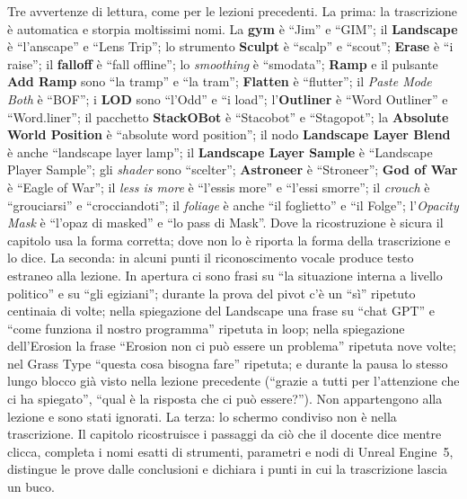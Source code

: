 Tre avvertenze di lettura, come per le lezioni precedenti. La prima: la trascrizione è
automatica e storpia moltissimi nomi. La \textbf{gym} è ``Jim'' e ``GIM''; il
\textbf{Landscape} è ``l'anscape'' e ``Lens Trip''; lo strumento \textbf{Sculpt} è ``scalp''
e ``scout''; \textbf{Erase} è ``i raise''; il \textbf{falloff} è ``fall offline''; lo
\emph{smoothing} è ``smodata''; \textbf{Ramp} e il pulsante \textbf{Add Ramp} sono ``la
tramp'' e ``la tram''; \textbf{Flatten} è ``flutter''; il \emph{Paste Mode Both} è ``BOF'';
i \textbf{LOD} sono ``l'Odd'' e ``i load''; l'\textbf{Outliner} è ``Word Outliner'' e
``Word.liner''; il pacchetto \textbf{StackOBot} è ``Stacobot'' e ``Stagopot''; la
\textbf{Absolute World Position} è ``absolute word position''; il nodo
\textbf{Landscape Layer Blend} è anche ``landscape layer lamp''; il \textbf{Landscape
Layer Sample} è ``Landscape Player Sample''; gli \emph{shader} sono ``scelter'';
\textbf{Astroneer} è ``Stroneer''; \textbf{God of War} è ``Eagle of War''; il \emph{less is
more} è ``l'essis more'' e ``l'essi smorre''; il \emph{crouch} è ``grouciarsi'' e
``crocciandoti''; il \emph{foliage} è anche ``il foglietto'' e ``il Folge''; l'\emph{Opacity
Mask} è ``l'opaz di masked'' e ``lo pass di Mask''. Dove la ricostruzione è sicura il
capitolo usa la forma corretta; dove non lo è riporta la forma della trascrizione e lo
dice. La seconda: in alcuni punti il riconoscimento vocale produce testo estraneo alla
lezione. In apertura ci sono frasi su ``la situazione interna a livello politico'' e su
``gli egiziani''; durante la prova del pivot c'è un ``sì'' ripetuto centinaia di volte;
nella spiegazione del Landscape una frase su ``chat GPT'' e ``come funziona il nostro
programma'' ripetuta in loop; nella spiegazione dell'Erosion la frase ``Erosion non ci può
essere un problema'' ripetuta nove volte; nel Grass Type ``questa cosa bisogna fare''
ripetuta; e durante la pausa lo stesso lungo blocco già visto nella lezione precedente
(``grazie a tutti per l'attenzione che ci ha spiegato'', ``qual è la risposta che ci può
essere?''). Non appartengono alla lezione e sono stati ignorati. La terza: lo schermo
condiviso non è nella trascrizione. Il capitolo ricostruisce i passaggi da ciò che il
docente dice mentre clicca, completa i nomi esatti di strumenti, parametri e nodi di
Unreal Engine~5, distingue le prove dalle conclusioni e dichiara i punti in cui la
trascrizione lascia un buco.


